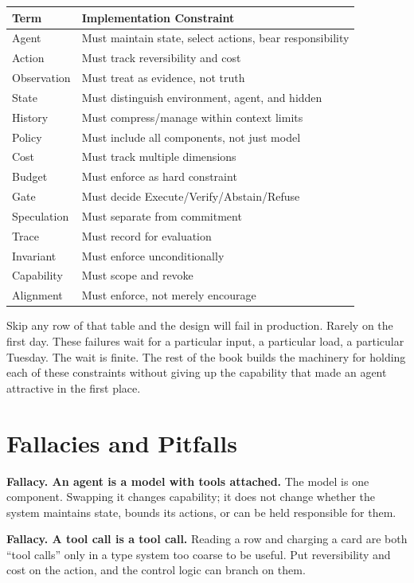 \begin{center}
\begin{tabular}{ll}
\toprule
Term & Implementation Constraint \\
\midrule
Agent & Must maintain state, select actions, bear responsibility \\
Action & Must track reversibility and cost \\
Observation & Must treat as evidence, not truth \\
State & Must distinguish environment, agent, and hidden \\
History & Must compress/manage within context limits \\
Policy & Must include all components, not just model \\
Cost & Must track multiple dimensions \\
Budget & Must enforce as hard constraint \\
Gate & Must decide Execute/Verify/Abstain/Refuse \\
Speculation & Must separate from commitment \\
Trace & Must record for evaluation \\
Invariant & Must enforce unconditionally \\
Capability & Must scope and revoke \\
Alignment & Must enforce, not merely encourage \\
\bottomrule
\end{tabular}
\end{center}

Skip any row of that table and the design will fail in production. Rarely on the first day. These failures wait for a particular input, a particular load, a particular Tuesday. The wait is finite. The rest of the book builds the machinery for holding each of these constraints without giving up the capability that made an agent attractive in the first place.

\section{Fallacies and Pitfalls}

\textbf{Fallacy. An agent is a model with tools attached.} The model is one
component. Swapping it changes capability; it does not change whether the system
maintains state, bounds its actions, or can be held responsible for them.

\textbf{Fallacy. A tool call is a tool call.} Reading a row and charging a card
are both ``tool calls'' only in a type system too coarse to be useful. Put
reversibility and cost on the action, and the control logic can branch on them.


